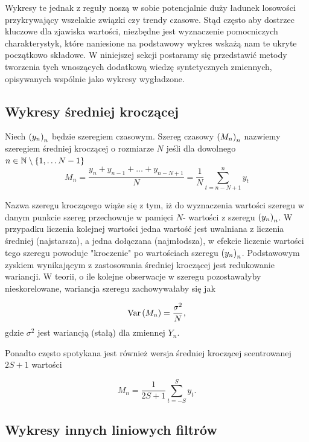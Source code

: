 \documentclass[10pt,a4paper]{book}
\begin{document}
Wykresy te jednak z reguły noszą w sobie potencjalnie duży ładunek losowości przykrywający wszelakie związki czy trendy czasowe. Stąd często aby dostrzec kluczowe dla zjawiska wartości, niezbędne jest wyznaczenie pomocniczych charakterystyk, które naniesione na podstawowy wykres wskażą nam te ukryte początkowo składowe. W niniejszej sekcji postaramy się przedstawić metody tworzenia tych wnoszących dodatkową wiedzę syntetycznych zmiennych, opisywanych wspólnie jako wykresy wygładzone.

\subsection{Wykresy średniej kroczącej}

\begin{definition}
Niech $\left( {y_n} \right)_{n}^{} $ będzie szeregiem czasowym. Szereg czasowy $\left( {M_n} \right)_{n}^{}$ nazwiemy szeregiem średniej kroczącej o rozmiarze $N$ jeśli dla dowolnego $n \in \mathbb{N} \setminus \left\lbrace {1,\ldots N-1} \right\rbrace $
$$
M_n = \frac{y_n + y_{n-1} + \ldots + y_{n-N+1}}{N} = \frac{1}{N} \sum_{t = n-N+1}^{n} y_t
$$  
\end{definition}

Nazwa szeregu kroczącego wiąże się z tym, iż do wyznaczenia wartości szeregu w danym punkcie szereg przechowuje w pamięci $N$- wartości z szeregu $\left( {y_n} \right)_{n}^{}$. W przypadku liczenia kolejnej wartości jedna wartość jest uwalniana z liczenia średniej (najstarsza), a jedna dołączana (najmłodsza), w efekcie liczenie wartości tego szeregu powoduje "kroczenie" po wartościach szeregu $\left( {y_n} \right)_{n}^{} $. Podstawowym zyskiem wynikającym z zastosowania średniej kroczącej jest redukowanie wariancji. W teorii, o ile kolejne obserwacje w szeregu pozostawałyby nieskorelowane, wariancja szeregu zachowywałaby się jak

$$
\operatorname{Var} \left( {M_n} \right) = \frac{\sigma^2}{N},
$$
gdzie $\sigma^2$ jest wariancją (stałą) dla zmiennej $Y_n$.

Ponadto często spotykana jest również wersja średniej kroczącej scentrowanej $2S +1 $  wartości

$$
M_n = \frac{1}{2S+1} \sum_{t=-S}^{S} y_t.
$$

\subsection{Wykresy innych liniowych filtrów}
\end{document}
